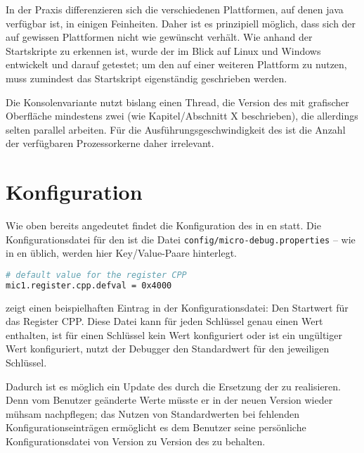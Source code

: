 In der Praxis differenzieren sich die verschiedenen Plattformen, auf denen \gls{java} verfügbar ist, in einigen Feinheiten. Daher ist es prinzipiell möglich, dass sich der \md auf gewissen Plattformen nicht wie gewünscht verhält. Wie anhand der Startskripte zu erkennen ist, wurde der \md im Blick auf Linux und Windows entwickelt und darauf getestet; um den \md auf einer weiteren Plattform zu nutzen, muss zumindest das Startskript eigenständig geschrieben werden.

Die Konsolenvariante nutzt bislang einen Thread, die Version des \md mit grafischer Oberfläche mindestens zwei (wie Kapitel/Abschnitt X beschrieben), die allerdings selten parallel arbeiten. Für die Ausführungsgeschwindigkeit des \md ist die Anzahl der verfügbaren Prozessorkerne daher irrelevant.

\section{Konfiguration}
Wie oben bereits angedeutet findet die Konfiguration des \md in en statt. Die Konfigurationsdatei für den \md ist die Datei \texttt{config/micro-debug.properties} -- wie in en üblich, werden hier Key/Value-Paare hinterlegt.

\begin{lstlisting}[language=sh,caption={Eintrag in \texttt{conf/micro-debug.properties}},label=\lstlbl{md-props-entry}]
# default value for the register CPP
mic1.register.cpp.defval = 0x4000
\end{lstlisting}

 zeigt einen beispielhaften Eintrag in der Konfigurationsdatei: Den Startwert für das Register CPP. Diese Datei kann für jeden Schlüssel genau einen Wert enthalten, ist für einen Schlüssel kein Wert konfiguriert oder ist ein ungültiger Wert konfiguriert, nutzt der Debugger den Standardwert für den jeweiligen Schlüssel.

Dadurch ist es möglich ein Update des \md durch die Ersetzung der  zu realisieren. Denn vom Benutzer geänderte Werte müsste er in der neuen Version wieder mühsam nachpflegen; das Nutzen von Standardwerten bei fehlenden Konfigurationseinträgen ermöglicht es dem Benutzer seine persönliche Konfigurationsdatei von Version zu Version des \md zu behalten.

